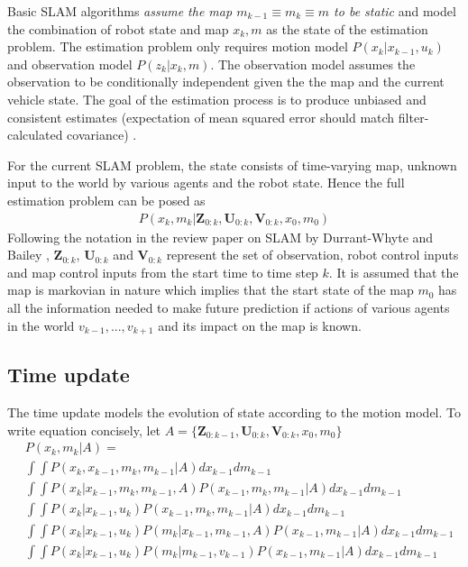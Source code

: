 \documentclass[conference]{IEEEtran}
\begin{document}
Basic SLAM algorithms \textit{assume the map $m_{k-1} \equiv m_k \equiv m$ to be static} and model the combination of robot state and map $x_k,m$ as the state of the estimation problem. The estimation problem only requires motion model $P(x_k|x_{k-1},u_k)$ and observation model $P(z_k|x_k,m)$. The observation model assumes the observation to be conditionally independent given the the map and the current vehicle state. The goal of the estimation process is to produce unbiased and consistent estimates (expectation of mean squared error should match filter-calculated covariance) \cite{yaakov2001estimation}.

For the current SLAM problem, the state consists of time-varying map, unknown input to the world by various agents and the robot state. Hence the full estimation problem can be posed as 
\begin{align}
P(x_k,m_k|\mathbf{Z}_{0:k},\mathbf{U}_{0:k},\mathbf{V}_{0:k},x_0,m_0)
\end{align}
Following the notation in the review paper on SLAM by Durrant-Whyte and Bailey \cite{durrant2006simultaneous}, $\mathbf{Z}_{0:k}$, $\mathbf{U}_{0:k}$ and $\mathbf{V}_{0:k}$ represent the set of observation, robot control inputs and map control inputs from the start time to time step $k$. It is assumed that the map is markovian in nature which implies that the start state of the map $m_0$ has all the information needed to make future prediction if actions of various agents in the world $v_{k-1},...,v_{k+1}$ and its impact on the map is known.

\subsection{Time update} The time update models the evolution of state according to the motion model. To write equation concisely, let $A =\{ \mathbf{Z}_{0:k-1},\mathbf{U}_{0:k},\mathbf{V}_{0:k},x_0,m_0 \}$
\begin{align}
&P(x_k,m_k|A) = \nonumber \\
&\int \int P(x_k,x_{k-1},m_k,m_{k-1}|A) dx_{k-1} dm_{k-1} \nonumber \\
&\int \int P(x_k|x_{k-1},m_k,m_{k-1},A)P(x_{k-1},m_k,m_{k-1}|A) dx_{k-1}dm_{k-1} \nonumber \\
&\int \int P(x_k|x_{k-1},u_k)P(x_{k-1},m_k,m_{k-1}|A) dx_{k-1}dm_{k-1} \nonumber \\
&\int \int P(x_k|x_{k-1},u_k)P(m_k|x_{k-1},m_{k-1},A)P(x_{k-1},m_{k-1}|A)  dx_{k-1}dm_{k-1} \nonumber \\
&\int \int P(x_k|x_{k-1},u_k)P(m_k|m_{k-1},v_{k-1})P(x_{k-1},m_{k-1}|A) dx_{k-1}dm_{k-1} \nonumber \\
\label{eq:time_update}
\end{align}
\end{document}
